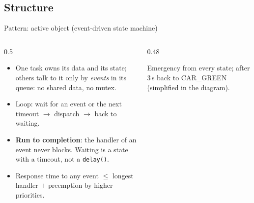 \subsection{Structure}
\begin{frame}{Pattern: active object (event-driven state machine)}
  \begin{columns}[T]
    \begin{column}{0.5\textwidth}
      \small
      \begin{itemize}
        \item One task owns its data and its state; others talk to it only by \emph{events} in its queue: no shared data, no mutex.
        \item Loop: wait for an event or the next timeout $\rightarrow$ dispatch $\rightarrow$ back to waiting.
        \item \textbf{Run to completion}: the handler of an event never blocks. Waiting is a state with a timeout, not a \texttt{delay()}.
        \item Response time to any event $\le$ longest handler $+$ preemption by higher priorities.
      \end{itemize}
    \end{column}
    \begin{column}{0.48\textwidth}
      \begin{center}
      \end{center}
      \scriptsize Emergency from every state; after 3\,s back to CAR\_GREEN (simplified in the diagram).
    \end{column}
  \end{columns}
\end{frame}

